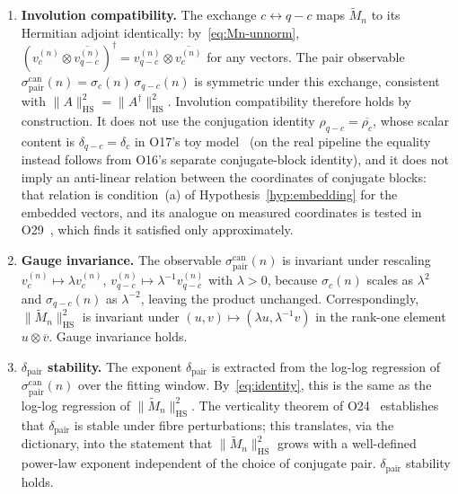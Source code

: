 \documentclass[12pt,a4paper]{article}
\theoremstyle{definition}
\theoremstyle{remark}
\begin{document}
      \begin{enumerate}[label=(\roman*)]

\item \textbf{Involution compatibility.}
The exchange $c \leftrightarrow q-c$ maps $\widetilde{M}_n$ to its Hermitian adjoint identically:
by~\eqref{eq:Mn-unnorm}, $(v_c^{(n)} \otimes \overline{v_{q-c}^{(n)}})^\dagger
= v_{q-c}^{(n)} \otimes \overline{v_c^{(n)}}$ for any vectors.
The pair observable $\sigma^{\mathrm{can}}_{\mathrm{pair}}(n) =
\sigma_c(n)\,\sigma_{q-c}(n)$ is symmetric under this exchange, consistent
with $\|A\|_{\mathrm{HS}}^2 = \|A^\dagger\|_{\mathrm{HS}}^2$.
Involution compatibility therefore holds by construction.
It does not use the conjugation identity $\rho_{q-c} = \overline{\rho_c}$, whose scalar content is
$\delta_{q-c} = \delta_c$ in O17's toy model~\cite{Beau2026a21} (on the real pipeline the equality
instead follows from O16's separate conjugate-block identity), and it does not imply an anti-linear relation between
the coordinates of conjugate blocks: that relation is condition~(a) of
Hypothesis~\ref{hyp:embedding} for the embedded vectors, and its analogue on measured coordinates is
tested in O29~\cite{Beau2026a33}, which finds it satisfied only approximately.

\item \textbf{Gauge invariance.}
The observable $\sigma^{\mathrm{can}}_{\mathrm{pair}}(n)$ is invariant under
rescaling $v_c^{(n)} \mapsto \lambda v_c^{(n)}$,
$v_{q-c}^{(n)} \mapsto \lambda^{-1} v_{q-c}^{(n)}$ with $\lambda > 0$,
because $\sigma_c(n)$ scales as $\lambda^2$ and $\sigma_{q-c}(n)$ as
$\lambda^{-2}$, leaving the product unchanged.
Correspondingly, $\|\widetilde{M}_n\|_{\mathrm{HS}}^2$ is invariant under
$(u, v) \mapsto (\lambda u, \lambda^{-1} v)$ in the rank-one element
$u \otimes \overline{v}$.
Gauge invariance holds.

\item \textbf{$\delta_{\mathrm{pair}}$ stability.}
The exponent $\delta_{\mathrm{pair}}$ is extracted from the log-log regression
of $\sigma^{\mathrm{can}}_{\mathrm{pair}}(n)$ over the fitting window.
By~\eqref{eq:identity}, this is the same as the log-log regression of
$\|\widetilde{M}_n\|_{\mathrm{HS}}^2$.
The verticality theorem of O24~\cite{Beau2026a28} establishes that
$\delta_{\mathrm{pair}}$ is stable under fibre perturbations; this translates,
via the dictionary, into the statement that $\|\widetilde{M}_n\|_{\mathrm{HS}}^2$
grows with a well-defined power-law exponent independent of the choice of
conjugate pair.
$\delta_{\mathrm{pair}}$ stability holds.

      \end{enumerate}
\end{document}
